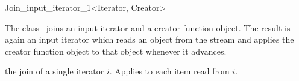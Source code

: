 \begin{ccRefClass}{Join_input_iterator_1<Iterator, Creator>}
  \label{sectionJoinInputIterator}
  
  \ccDefinition The class \ccRefName\ joins an input iterator and a
  creator function object. The result is again an input iterator which
  reads an object from the stream and applies the creator function
  object to that object whenever it advances.

  
  \ccIsModel {}

  \ccTypes
  
  \ccCreation{}
  
   {the join of a
    single iterator $i$. Applies  to each item read from
    $i$.}

  \ccSeeAlso
\end{ccRefClass}


